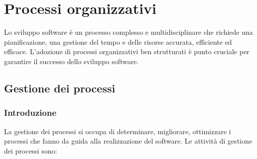 
\section{Processi organizzativi}
Lo sviluppo software è un processo complesso e multidisciplinare che richiede una pianificazione, una gestione del tempo e delle risorse accurata, efficiente ed efficace. L'adozione di processi organizzativi ben strutturati è punto cruciale per garantire il successo dello sviluppo software.
\subsection{Gestione dei processi}
\subsubsection{Introduzione}
La gestione dei processi si occupa di determinare, migliorare, ottimizzare i processi che fanno da guida alla realizzazione del software. Le attività di gestione dei processi sono:
